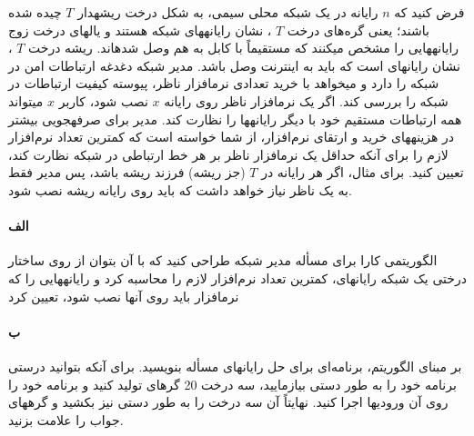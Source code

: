 \documentclass[]{article}
\begin{document}
فرض کنید که $n$ رایانه در یک شبکه محلی سیمی، به شکل درخت ریشهدار $T$ چیده شده باشند؛
یعنی گره‌های درخت $T$ ، نشان رایانههای شبکه هستند و یالهای درخت زوج رایانههایی را مشخص میکنند که مستقیماً با کابل به هم وصل شدهاند.
ریشه درخت $T$ ، نشان رایانهای است که باید به اینترنت وصل باشد. مدیر شبکه دغدغه ارتباطات امن در شبکه را دارد و میخواهد با خرید تعدادی نرمافزار ناظر، پیوسته کیفیت ارتباطات در شبکه را بررسی کند.
اگر یک نرمافزار ناظر روی رایانه $x$ نصب شود، کاربر $x$ میتواند همه ارتباطات مستقیم خود با دیگر رایانهها را نظارت کند.
مدیر برای صرفهجویی بیشتر در هزینههای خرید و ارتقای نرم‌افزار، از شما خواسته است که کمترین تعداد نرم‌افزار لازم را برای آنکه حداقل یک نرمافزار ناظر بر هر خط ارتباطی در شبکه نظارت کند، تعیین کنید.
برای مثال، اگر هر رایانه در $T$ (جز ریشه) فرزند ریشه باشد، پس مدیر فقط به یک ناظر نیاز خواهد داشت که باید روی رایانه ریشه نصب شود.

\paragraph*{الف}
الگوریتمی کارا برای مسأله مدیر شبکه طراحی کنید که با آن بتوان از روی ساختار درختی یک شبکه رایانهای، کمترین تعداد نرم‌افزار لازم را محاسبه کرد و رایانههایی را که نرمافزار باید روی آنها نصب شود، تعیین کرد

\paragraph*{ب}
بر مبنای الگوریتم، برنامه‌ای برای حل رایانهای مسأله بنویسید. برای آنکه بتوانید درستی برنامه خود را به طور دستی بیازمایید،
سه درخت 20 گرهای تولید کنید و برنامه خود را روی آن ورودیها اجرا کنید. نهایتاً آن سه درخت را به طور دستی نیز بکشید و گرههای جواب را علامت بزنید.
\end{document}
